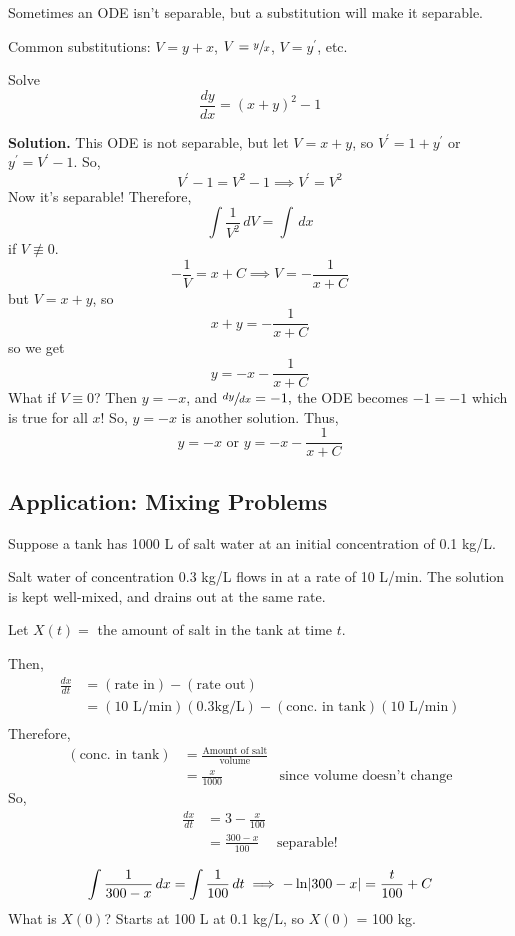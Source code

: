 Sometimes an ODE isn't separable, but a substitution will make it separable.

Common substitutions: $ V=y+x $, $ V=\sfrac{y}{x} $, $ V=y^\prime $, etc.

\begin{Example}{}{}
    Solve
    \[ \frac{dy}{dx} =(x+y)^2-1 \]

    \textbf{Solution.} This ODE is not separable, but let $ V=x+y $, so
    $ V^\prime=1+y^\prime $ or $ y^\prime=V^\prime-1 $. So,
    \[ V^\prime-1=V^2-1\implies V^\prime=V^2 \]
    Now it's separable! Therefore,
    \[ \int \frac{1}{V^2} \, d{V} =\int \, d{x} \]
    if $ V\not\equiv 0 $.
    \[ -\frac{1}{V} =x+C\implies V=-\frac{1}{x+C} \]
    but $ V=x+y $, so
    \[ x+y=-\frac{1}{x+C} \]
    so we get
    \[ y=-x-\frac{1}{x+C} \]
    What if $ V\equiv 0 $? Then $ y=-x $, and $ \sfrac{dy}{dx}=-1, $ the ODE becomes
    $ -1=-1 $ which is true for all $ x $! So, $ y=-x $ is another solution. Thus,
    \[ y=-x\text{ or }y=-x-\frac{1}{x+C} \]
\end{Example}

\subsection*{Application: Mixing Problems}
Suppose a tank has 1000 L of salt water at an initial concentration of
0.1 kg/L.

Salt water of concentration 0.3 kg/L flows in at a rate of 10 L/min. The solution is
kept well-mixed, and drains out at the same rate.

Let $ X(t)= $ the amount of salt in the tank at time $ t $.

Then,
\begin{align*}
    \frac{dx}{dt}
     & =(\text{rate in})-(\text{rate out})                                         \\
     & =(10\text{ L/min})(0.3\text{kg/L})-(\text{conc.\ in tank})(10\text{ L/min}) \\
\end{align*}
Therefore,
\begin{align*}
    (\text{conc.\ in tank})
     & =\frac{\text{Amount of salt}}{\text{volume}}                                      \\
     & =\frac{x}{1000}                              & \text{since volume doesn't change}
\end{align*}
So,
\begin{align*}
    \frac{dx}{dt}
     & =3-\frac{x}{100}                       \\
     & =\frac{300-x}{100} & \text{separable!} \\
\end{align*}
\[ \int \frac{1}{300-x} \, d{x}=\int \frac{1}{100} \, d{t} \implies -\ln\lvert300-x\rvert=\frac{t}{100} +C \]
What is $ X(0) $? Starts at 100 L at 0.1 kg/L, so $ X(0) $ = 100 kg.


